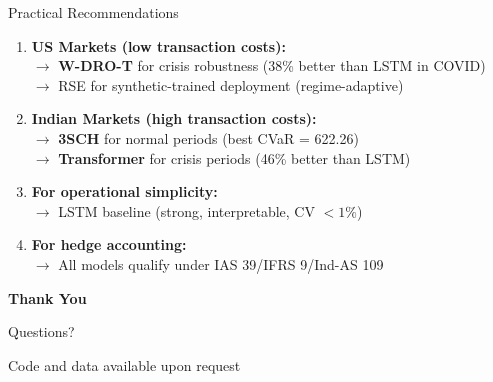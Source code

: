 \documentclass[aspectratio=169,11pt]{beamer}
\begin{document}
\begin{frame}{Practical Recommendations}
\begin{tcolorbox}[colback=blue!5, colframe=darkblue, title=Model Selection Guidelines by Market]
\begin{enumerate}
    \item \textbf{US Markets (low transaction costs):}\\
    $\rightarrow$ \textbf{W-DRO-T} for crisis robustness (38\% better than LSTM in COVID)\\
    $\rightarrow$ RSE for synthetic-trained deployment (regime-adaptive)
    
    \vspace{0.2cm}
    \item \textbf{Indian Markets (high transaction costs):}\\
    $\rightarrow$ \textbf{3SCH} for normal periods (best CVaR = 622.26)\\
    $\rightarrow$ \textbf{Transformer} for crisis periods (46\% better than LSTM)
    
    \vspace{0.2cm}
    \item \textbf{For operational simplicity:}\\
    $\rightarrow$ LSTM baseline (strong, interpretable, CV $< 1\%$)
    
    \vspace{0.2cm}
    \item \textbf{For hedge accounting:}\\
    $\rightarrow$ All models qualify under IAS 39/IFRS 9/Ind-AS 109
\end{enumerate}
\end{tcolorbox}
\end{frame}

\begin{frame}
\begin{center}
\Huge{\textbf{Thank You}}

\vspace{1cm}
\Large{Questions?}

\vspace{1cm}
\normalsize
Code and data available upon request
\end{center}
\end{frame}

\appendix
\end{document}
